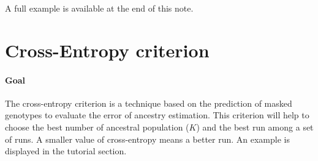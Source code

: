 \documentclass[10pt,a4paper]{article}
\begin{document}
\noindent
A full example is available at the end of this note.

\section{Cross-Entropy criterion}

\paragraph{Goal}
The cross-entropy criterion is a technique based on the prediction of masked genotypes to evaluate
the error of ancestry estimation. This criterion will help to choose the 
best number of ancestral population ($K$) and the best run among a set of runs. A smaller value
of cross-entropy means a better run. An example is displayed in the tutorial section.
\end{document}
